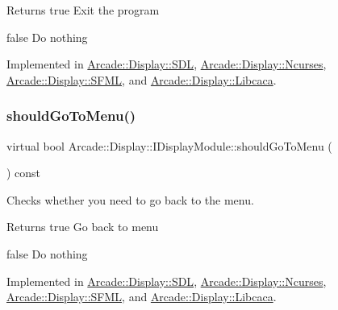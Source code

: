\begin{DoxyReturn}{Returns}
true Exit the program 

false Do nothing 
\end{DoxyReturn}


Implemented in \mbox{\hyperlink{classArcade_1_1Display_1_1SDL_adb5d8837174b0ca120a27a521320f9c0}{Arcade\+::\+Display\+::\+S\+DL}}, \mbox{\hyperlink{classArcade_1_1Display_1_1Ncurses_a6d27fa12cb2086a3ded2f40462c5ddab}{Arcade\+::\+Display\+::\+Ncurses}}, \mbox{\hyperlink{classArcade_1_1Display_1_1SFML_a780a71713551c8dffd1f008802f96767}{Arcade\+::\+Display\+::\+S\+F\+ML}}, and \mbox{\hyperlink{classArcade_1_1Display_1_1Libcaca_a5920c296d51d72df55b5079c0749031e}{Arcade\+::\+Display\+::\+Libcaca}}.

\mbox{\label{classArcade_1_1Display_1_1IDisplayModule_ad060f6b99f2adffaf02a4226fc40d0ab}} 
\subsubsection{\texorpdfstring{shouldGoToMenu()}{shouldGoToMenu()}}
{\footnotesize\ttfamily virtual bool Arcade\+::\+Display\+::\+I\+Display\+Module\+::should\+Go\+To\+Menu (\begin{DoxyParamCaption}{ }\end{DoxyParamCaption}) const\hspace{0.3cm}{\ttfamily [pure virtual]}}



Checks whether you need to go back to the menu. 

\begin{DoxyReturn}{Returns}
true Go back to menu 

false Do nothing 
\end{DoxyReturn}


Implemented in \mbox{\hyperlink{classArcade_1_1Display_1_1SDL_a044e009d7fc03813fce09abed3a6694c}{Arcade\+::\+Display\+::\+S\+DL}}, \mbox{\hyperlink{classArcade_1_1Display_1_1Ncurses_a807e935000fce3f6f405cb6aa6239246}{Arcade\+::\+Display\+::\+Ncurses}}, \mbox{\hyperlink{classArcade_1_1Display_1_1SFML_a3072fbe4dd92685154da10cbd602bc3b}{Arcade\+::\+Display\+::\+S\+F\+ML}}, and \mbox{\hyperlink{classArcade_1_1Display_1_1Libcaca_aaa4a4a114dee18576dd93ca09808004e}{Arcade\+::\+Display\+::\+Libcaca}}.


